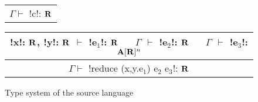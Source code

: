 \begin{figure*}[tb]
    \begin{tabular}{c} 
        \\\hline
        $\Gamma \vdash$ !c!: $\mathbf{R}$
    \end{tabular}
    \hspace{0.5cm}
    \begin{tabular}{c}
        !x!: $\mathbf{R}$, !y!: $\mathbf{R}$ $\vdash$ !e$_1$!: $\mathbf{R}$ 
        $\quad$ $\Gamma$ $\vdash$ !e$_2$!: $\mathbf{R}$
        $\quad$ $\Gamma$ $\vdash$ !e$_3$!: $\mathbf{A}[\mathbf{R}]^{n}$
        \\\hline  
        $\Gamma \vdash$ !reduce (x,y.e$_1$) e$_2$ e$_3$!: $\mathbf{R}$
    \end{tabular}
    \vspace{-0.2cm}
    \caption{Type system of the source language}
    \vspace{-0.4cm}
    \label{fig:source_typesystem}
    \end{figure*}